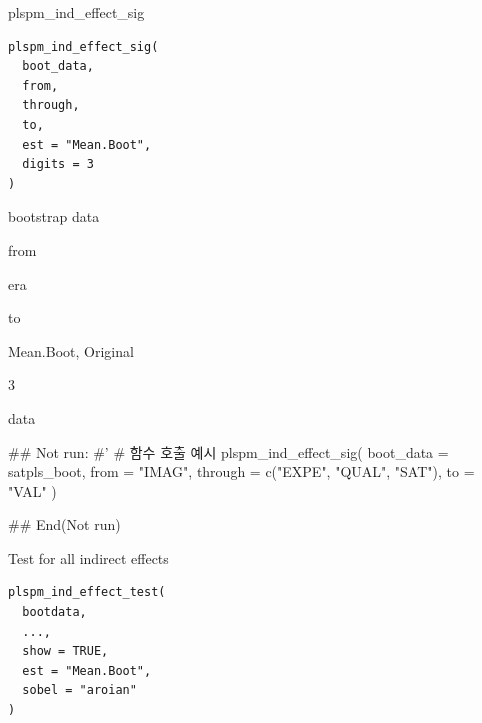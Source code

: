 \documentclass[a4paper]{book}
\begin{document}
%
\begin{Description}
plspm\_ind\_effect\_sig
\end{Description}
%
\begin{Usage}
\begin{verbatim}
plspm_ind_effect_sig(
  boot_data,
  from,
  through,
  to,
  est = "Mean.Boot",
  digits = 3
)
\end{verbatim}
\end{Usage}
%
\begin{Arguments}
\begin{ldescription}
\item[\code{boot\_data}] bootstrap data

\item[\code{from}] from

\item[\code{through}] era

\item[\code{to}] to

\item[\code{est}] Mean.Boot, Original

\item[\code{digits}] 3
\end{ldescription}
\end{Arguments}
%
\begin{Value}
data
\end{Value}
%
\begin{Examples}
\begin{ExampleCode}

## Not run: 
#'
# 함수 호출 예시
plspm_ind_effect_sig(
  boot_data = satpls_boot,
  from = "IMAG",
  through = c("EXPE", "QUAL", "SAT"),
  to = "VAL"
)


## End(Not run)



\end{ExampleCode}
\end{Examples}
%
\begin{Description}
Test for all indirect effects
\end{Description}
%
\begin{Usage}
\begin{verbatim}
plspm_ind_effect_test(
  bootdata,
  ...,
  show = TRUE,
  est = "Mean.Boot",
  sobel = "aroian"
)
\end{verbatim}
\end{Usage}
\end{document}
